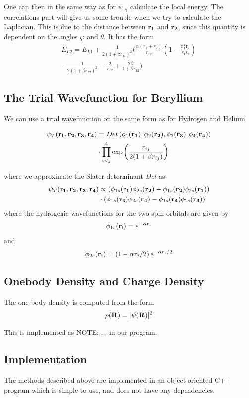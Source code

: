\documentclass[twocolumn]{article}[10pt]
\newcommand{\eq}[1]{\begin{align*}#1\end{align*}}
\renewcommand\vec[1]{{\bf #1}}
\begin{document}
One can then in the same way as for $\psi_{T1}$ calculate
the local energy. The correlations part will give us some trouble
when we try to calculate the Laplacian. This is due to
the distance between $\vec r_1$ and $\vec r_2$, since this quantity
is dependent on the angles $\varphi$ and $\theta$.
It has the form
{\small
\eq{
	E_{L2} = E_{L1}+\frac{1}{2(1+\beta r_{12})^2}
	\bigg(\frac{\alpha(r_1+r_2)}{r_{12}}(1-
	\frac{\mathbf{r}_1^T\mathbf{r}_2}{r_1r_2})\\
	-\frac{1}{2(1+\beta r_{12})^2}-\frac{2}{r_{12}}+
	\frac{2\beta}{1+\beta r_{12}}\bigg)
}}%

\subsection{The Trial Wavefunction for Beryllium}
We can use a trial wavefunction on the same form as for
Hydrogen and Helium

{\small
\eq{
	\psi_{T}({\bf r_1},{\bf r_2}, {\bf r_3}, {\bf r_4}) &= 
 	Det\left(\phi_{1}({\bf r_1}),\phi_{2}({\bf r_2}),
	\phi_{3}({\bf r_3}),\phi_{4}({\bf r_4})\right)\\ &\cdot
   	\prod_{i<j}^{4}\exp{\left(\frac{r_{ij}}{2(1+\beta r_{ij})}\right)}
}}%

where we approximate the Slater determinant \textit{Det} as
{\small
\eq{
	\psi_{T}({\bf r_1},{\bf r_2}, {\bf r_3}, {\bf r_4})&\propto 
	\left(\phi_{1s}({\bf r_1})\phi_{2s}({\bf r_2})-\phi_{1s}({\bf r_2})
	\phi_{2s}({\bf r_1})\right)\\
	&\cdot\left(\phi_{1s}({\bf r_3})\phi_{2s}({\bf r_4})
	-\phi_{1s}({\bf r_4})\phi_{2s}({\bf r_3})\right)
}}%
where the hydrogenic wavefunctions for the two spin orbitals
are given by
{\small\eq{
\phi_{1s}({\bf r_i}) = e^{-\alpha r_i}
}} and
{\small\eq{
\phi_{2s}({\bf r_i}) = \left(1-\alpha r_i/2\right)e^{-\alpha r_i/2}
}}

\subsection{Onebody Density and Charge Density}
The one-body density is computed from the form 
{\small
\eq{
	\rho(\vec R) = |\psi(\vec R)|^2
}}%

This is implemented as NOTE: ... in our program. 

\subsection{Implementation}
The methods described above are implemented in an object oriented C++ program
which is simple to use, and does not have any dependencies. 
\end{document}
